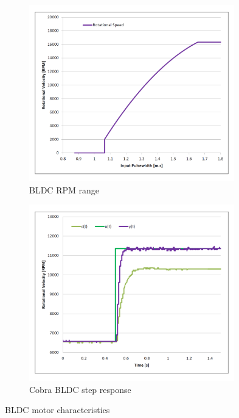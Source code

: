 \begin{figure}[hbtp]
\vspace{-20pt}
\begin{subfigure}{0.5\textwidth}
\centering
\includegraphics[width=0.98\textwidth]{graphs/bldc-range}
\caption{BLDC RPM range}
\label{fig:bldc-range}
\end{subfigure}
\begin{subfigure}{0.5\textwidth}
\centering
\includegraphics[width=0.98\textwidth]{graphs/BLDC-step}
\caption{Cobra BLDC step response}
\label{fig:bldc-step}
\end{subfigure}
\vspace{-10pt}
\caption{BLDC motor characteristics}
\vspace{-20pt}
\end{figure}
